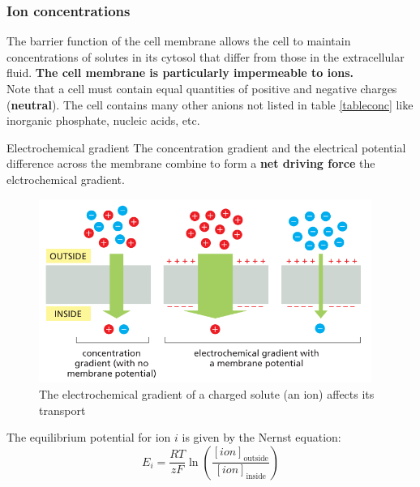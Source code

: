 \documentclass[../main.tex]{subfiles}
\begin{document}
\subsubsection{Ion concentrations}
The barrier function of the cell membrane allows the cell to maintain concentrations of solutes in its cytosol that differ from those in the extracellular fluid. \textbf{The cell membrane is particularly impermeable to ions.} \\
Note that a cell must contain equal quantities of positive and negative charges (\textbf{neutral}). The cell contains many other anions not listed in table \ref{tableconc} like inorganic phosphate, nucleic acids, etc. 

\begin{DefWithTitle}{Electrochemical gradient}
	The concentration gradient and the electrical potential difference across the membrane combine to form a \textbf{net driving force} the elctrochemical gradient. 
\end{DefWithTitle}
\begin{figure}[H]
	\centering
	\includegraphics[height = 6cm]{4}
	\caption{The electrochemical gradient of a charged solute (an ion) affects its transport}
\end{figure}
\noindent
The equilibrium potential for ion \(i\) is given by the Nernst equation:
\[
E_i = \frac{RT}{zF} \ln\left(\frac{[ion]_{\text{outside}}}{[ion]_{\text{inside}}}\right)
\]
\end{document}
